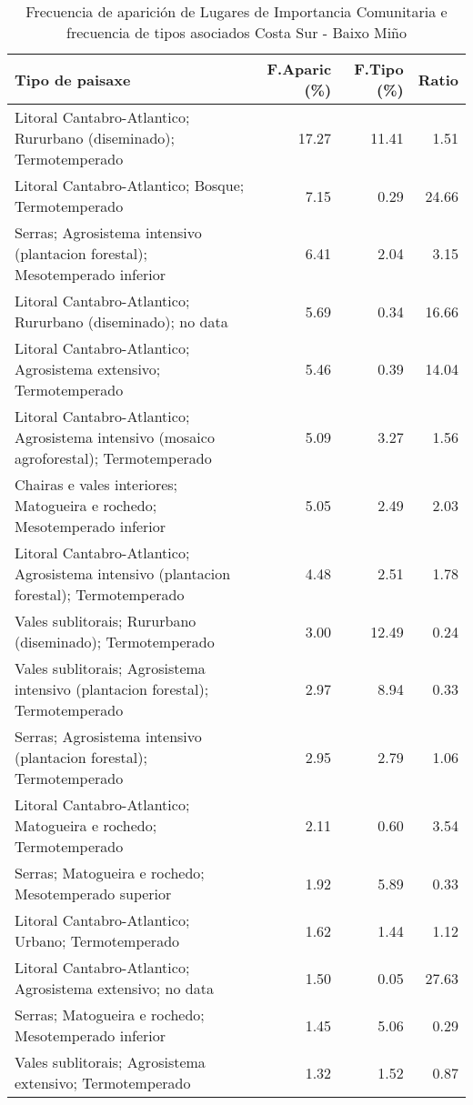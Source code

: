 \begin{table}[p]
\centering
\caption{Frecuencia de aparición de Lugares de Importancia Comunitaria e frecuencia de tipos asociados Costa Sur - Baixo Miño} 
\label{vnatura3}
\begin{tabular}{lrrr}
  \hline
Tipo de paisaxe & F.Aparic (\%) & F.Tipo (\%) & Ratio \\ 
  \hline
Litoral Cantabro-Atlantico; Rururbano (diseminado); Termotemperado & 17.27 & 11.41 & 1.51 \\ 
  Litoral Cantabro-Atlantico; Bosque; Termotemperado & 7.15 & 0.29 & 24.66 \\ 
  Serras; Agrosistema intensivo (plantacion forestal); Mesotemperado inferior & 6.41 & 2.04 & 3.15 \\ 
  Litoral Cantabro-Atlantico; Rururbano (diseminado); no data & 5.69 & 0.34 & 16.66 \\ 
  Litoral Cantabro-Atlantico; Agrosistema extensivo; Termotemperado & 5.46 & 0.39 & 14.04 \\ 
  Litoral Cantabro-Atlantico; Agrosistema intensivo (mosaico agroforestal); Termotemperado & 5.09 & 3.27 & 1.56 \\ 
  Chairas e vales interiores; Matogueira e rochedo; Mesotemperado inferior & 5.05 & 2.49 & 2.03 \\ 
  Litoral Cantabro-Atlantico; Agrosistema intensivo (plantacion forestal); Termotemperado & 4.48 & 2.51 & 1.78 \\ 
  Vales sublitorais; Rururbano (diseminado); Termotemperado & 3.00 & 12.49 & 0.24 \\ 
  Vales sublitorais; Agrosistema intensivo (plantacion forestal); Termotemperado & 2.97 & 8.94 & 0.33 \\ 
  Serras; Agrosistema intensivo (plantacion forestal); Termotemperado & 2.95 & 2.79 & 1.06 \\ 
  Litoral Cantabro-Atlantico; Matogueira e rochedo; Termotemperado & 2.11 & 0.60 & 3.54 \\ 
  Serras; Matogueira e rochedo; Mesotemperado superior & 1.92 & 5.89 & 0.33 \\ 
  Litoral Cantabro-Atlantico; Urbano; Termotemperado & 1.62 & 1.44 & 1.12 \\ 
  Litoral Cantabro-Atlantico; Agrosistema extensivo; no data & 1.50 & 0.05 & 27.63 \\ 
  Serras; Matogueira e rochedo; Mesotemperado inferior & 1.45 & 5.06 & 0.29 \\ 
  Vales sublitorais; Agrosistema extensivo; Termotemperado & 1.32 & 1.52 & 0.87 \\ 

\end{tabular}
\end{table}
